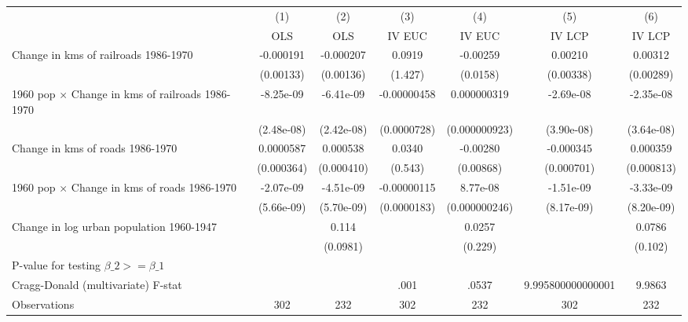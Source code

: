 {
\def\sym#1{\ifmmode^{#1}\else\(^{#1}\)\fi}
\begin{tabular}{l*{6}{c}}
\hline\hline
                &\multicolumn{1}{c}{(1)}&\multicolumn{1}{c}{(2)}&\multicolumn{1}{c}{(3)}&\multicolumn{1}{c}{(4)}&\multicolumn{1}{c}{(5)}&\multicolumn{1}{c}{(6)}\\
                &\multicolumn{1}{c}{OLS}&\multicolumn{1}{c}{OLS}&\multicolumn{1}{c}{IV EUC}&\multicolumn{1}{c}{IV EUC}&\multicolumn{1}{c}{IV LCP}&\multicolumn{1}{c}{IV LCP}\\
\hline
Change in kms of railroads 1986-1970&-0.000191         &-0.000207         &   0.0919         & -0.00259         &  0.00210         &  0.00312         \\
                &(0.00133)         &(0.00136)         &  (1.427)         & (0.0158)         &(0.00338)         &(0.00289)         \\
[1em]
1960 pop $\times$ Change in kms of railroads 1986-1970&-8.25e-09         &-6.41e-09         &-0.00000458         &0.000000319         &-2.69e-08         &-2.35e-08         \\
                &(2.48e-08)         &(2.42e-08)         &(0.0000728)         &(0.000000923)         &(3.90e-08)         &(3.64e-08)         \\
[1em]
Change in kms of roads 1986-1970&0.0000587         & 0.000538         &   0.0340         & -0.00280         &-0.000345         & 0.000359         \\
                &(0.000364)         &(0.000410)         &  (0.543)         &(0.00868)         &(0.000701)         &(0.000813)         \\
[1em]
1960 pop $\times$ Change in kms of roads 1986-1970&-2.07e-09         &-4.51e-09         &-0.00000115         & 8.77e-08         &-1.51e-09         &-3.33e-09         \\
                &(5.66e-09)         &(5.70e-09)         &(0.0000183)         &(0.000000246)         &(8.17e-09)         &(8.20e-09)         \\
[1em]
Change in log urban population 1960-1947&                  &    0.114         &                  &   0.0257         &                  &   0.0786         \\
                &                  & (0.0981)         &                  &  (0.229)         &                  &  (0.102)         \\
\hline
P-value for testing $\beta\_{2} >= \beta\_{1}$&                  &                  &                  &                  &                  &                  \\
Cragg-Donald (multivariate) F-stat&                  &                  &     .001         &    .0537         &9.995800000000001         &   9.9863         \\
Observations    &      302         &      232         &      302         &      232         &      302         &      232         \\
\hline\hline
\end{tabular}
}
